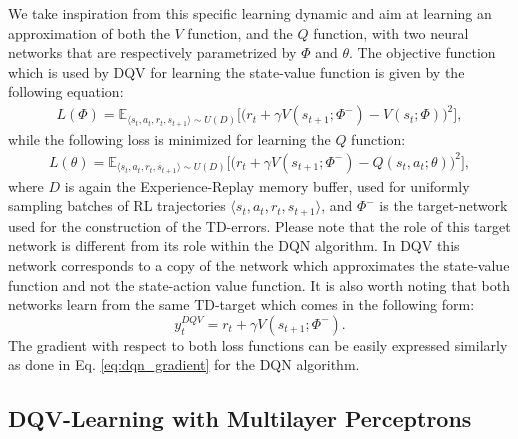 We take inspiration from this specific learning dynamic and aim at learning an approximation of both the $V$ function, and the $Q$ function, with two neural networks that are respectively parametrized by $\Phi$ and $\theta$. The objective function which is used by DQV for learning the state-value function is given by the following equation:
\begin{multline}
L(\Phi) = \mathds{E}_{\langle s_{t},a_{t},r_{t},s_{t+1}\rangle\sim U(D)} \bigg[\big(r_{t} + \gamma V(s_{t+1}; \Phi^{-}) - V(s_{t}; \Phi)\big)^{2}\bigg],
\label{eq:dqv_v_update}
\end{multline}
while the following loss is minimized for learning the $Q$ function:
\begin{multline}
    L(\theta) = \mathds{E}_{\langle s_{t},a_{t},r_{t},s_{t+1}\rangle\sim U(D)} \bigg[\big(r_{t} + \gamma V(s_{t+1}; \Phi^{-}) - Q(s_{t}, a_{t}; \theta)\big)^{2}\bigg],
\label{eq:dqv_q_update}
\end{multline}
where $D$ is again the Experience-Replay memory buffer, used for uniformly sampling batches of RL trajectories $\langle s_{t},a_{t},r_{t},s_{t+1}\rangle$, and $\Phi^{-}$ is the target-network used for the construction of the TD-errors. Please note that the role of this target network is different from its role within the DQN algorithm. In DQV this network corresponds to a copy of the network which approximates the state-value function and not the state-action value function. It is also worth noting that both networks learn from the same TD-target which comes in the following form:
\begin{equation}
y_{t}^{DQV} = r_{t} + \gamma V(s_{t+1}; \Phi^{-}). 
\end{equation}
The gradient with respect to both loss functions can be easily expressed similarly as done in Eq. \ref{eq:dqn_gradient} for the DQN algorithm.

\subsection{DQV-Learning with Multilayer Perceptrons}


